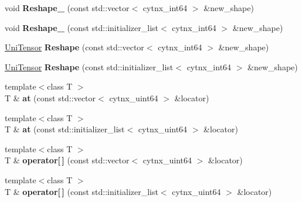 \begin{DoxyCompactItemize}
void {\bfseries Reshape\+\_\+} (const std\+::vector$<$ cytnx\+\_\+int64 $>$ \&new\+\_\+shape)
\item 
\mbox{\label{classcytnx_1_1UniTensor_a960fff66270eed53bee8eddf40007d27}} 
void {\bfseries Reshape\+\_\+} (const std\+::initializer\+\_\+list$<$ cytnx\+\_\+int64 $>$ \&new\+\_\+shape)
\item 
\mbox{\label{classcytnx_1_1UniTensor_aa5f14ae6c7f9e515e904d30f065e1dc5}} 
\hyperlink{classcytnx_1_1UniTensor}{Uni\+Tensor} {\bfseries Reshape} (const std\+::vector$<$ cytnx\+\_\+int64 $>$ \&new\+\_\+shape)
\item 
\mbox{\label{classcytnx_1_1UniTensor_a0d47436cf7fe9f3e29ce1ba9711b1be0}} 
\hyperlink{classcytnx_1_1UniTensor}{Uni\+Tensor} {\bfseries Reshape} (const std\+::initializer\+\_\+list$<$ cytnx\+\_\+int64 $>$ \&new\+\_\+shape)
\item 
\mbox{\label{classcytnx_1_1UniTensor_a432b37f45cd8a87ceefd45eb2d8e6330}} 
{\footnotesize template$<$class T $>$ }\\T \& {\bfseries at} (const std\+::vector$<$ cytnx\+\_\+uint64 $>$ \&locator)
\item 
\mbox{\label{classcytnx_1_1UniTensor_acca30968768c6e59e552b7ea0f1dde00}} 
{\footnotesize template$<$class T $>$ }\\T \& {\bfseries at} (const std\+::initializer\+\_\+list$<$ cytnx\+\_\+uint64 $>$ \&locator)
\item 
\mbox{\label{classcytnx_1_1UniTensor_a59acdb7ef1794cf3c98d9639989c31c3}} 
{\footnotesize template$<$class T $>$ }\\T \& {\bfseries operator\mbox{[}$\,$\mbox{]}} (const std\+::vector$<$ cytnx\+\_\+uint64 $>$ \&locator)
\item 
\mbox{\label{classcytnx_1_1UniTensor_a017d4d0b8740540838432e909542aa27}} 
{\footnotesize template$<$class T $>$ }\\T \& {\bfseries operator\mbox{[}$\,$\mbox{]}} (const std\+::initializer\+\_\+list$<$ cytnx\+\_\+uint64 $>$ \&locator)
\end{DoxyCompactItemize}
